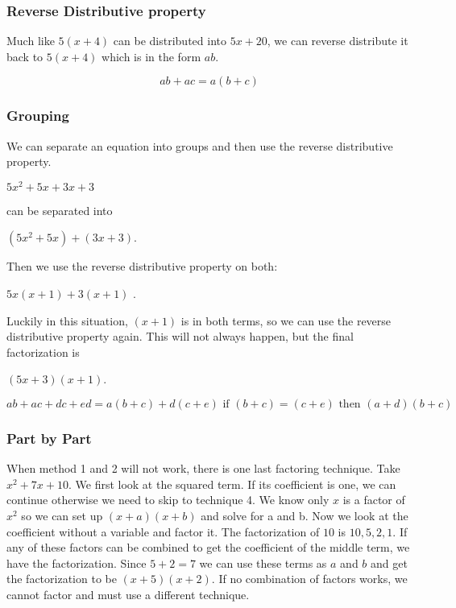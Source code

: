 \documentclass{book}
\theoremstyle{definition}
\begin{document}
\subsubsection{Reverse Distributive property}

Much like $5(x+4)$ can be distributed into $5x+20$, we can reverse distribute it back to $5(x+4)$ which is in the form $ab$.

\begin{equation}
\label{(6.5)}
ab+ac=a(b+c)
\end{equation}

\subsubsection{Grouping}

We can separate an equation into groups and then use the reverse distributive property. 
\begin{center}
$5x^2+5x+3x+3$
\end{center}
can be separated into

\begin{center}
$(5x^2+5x) +  (3x+3)$. 
\end{center}
Then we use the reverse distributive property on both: 

\begin{center}
$5x(x+1) + 3(x+1)$ . 
\end{center}
Luckily in this situation, $(x+1)$ is in both terms, so we can use the reverse distributive property again. This will not always happen, but the final factorization is 

\begin{center}
$(5x+3)(x+1)$.
\end{center}


\begin{equation}
\label{(6.6)}
ab+ac+dc+ed = a(b+c)+d(c+e)\text{ if }(b+c)=(c+e)\text{ then }(a+d)(b+c)
\end{equation}

\subsubsection{Part by Part} 

When method 1 and 2 will not work, there is one last factoring technique. Take $x^2+7x+10$. We first look at the squared term. If its coefficient is one, we can continue otherwise we need to skip to technique 4. We know only $x$ is a factor of $x^2$ so we can set up $(x+a)(x+b)$ and solve for a and b. Now we look at the coefficient without a variable and factor it. The factorization of $10$ is $10, 5, 2,1$.  If any of these factors can be combined to get the coefficient of the middle term, we have the factorization. Since $5+2=7$ we can use these terms as $a$ and $b$ and get the factorization to be $(x+5)(x+2)$. If no combination of factors works, we cannot factor and must use a different technique.
\end{document}
